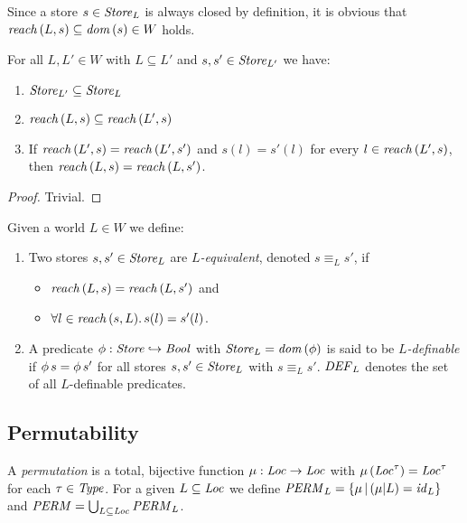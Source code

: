 \documentclass[12pt,a4paper]{report}
\newcommand{\DEF}{\nstyle{DEF}}
\newcommand{\PERM}{\nstyle{PERM}}
\newcommand{\id}{\nstyle{id}}
\begin{document}
Since a store $s\in\mathit{Store}_L$ is always closed by definition, it is obvious that
$\mathit{reach}\,(L,s) \subseteq \mathit{dom}\,(s) \in  W$ holds.

\begin{lemma}
  For all $L,L'\in W$ with $L \subseteq L'$ and $s,s'\in\mathit{Store}_{L'}$ we have:
  \begin{enumerate}
    \item $\mathit{Store}_{L'} \subseteq \mathit{Store}_L$
    \item $\mathit{reach}\,(L,s) \subseteq \mathit{reach}\,(L',s)$
    \item If $\mathit{reach}\,(L',s) = \mathit{reach}\,(L',s')$ and $s(l) = s'(l)$ for every $l\in\mathit{reach}\,(L',s)$,
          then $\mathit{reach}\,(L,s) = \mathit{reach}\,(L,s')$.
  \end{enumerate}
\end{lemma}

\begin{proof}
  Trivial.
\end{proof}

\begin{definition}
  Given a world $L \in W$ we define:
  \begin{enumerate}
    \item Two stores $s,s'\in\mathit{Store}_L$ are {\em $L$-equivalent}, denoted $s \equiv_L s'$, if
          \begin{itemize}
            \item $\mathit{reach}\,(L,s) = \mathit{reach}\,(L,s')$ and
            \item $\forall l\in\mathit{reach}\,(s,L).\,s(l)=s'(l)$.
          \end{itemize}

    \item A predicate $\phi:\mathit{Store} \hookrightarrow \mathit{Bool}$ with $\mathit{Store}_L = \mathit{dom}\,(\phi)$ is said to be
          {\em $L$-definable} if $\phi\,s = \phi\,s'$ for all stores
          $s,s'\in\mathit{Store}_L$ with $s \equiv_L s'$. $\DEF_L$ denotes the set of all $L$-definable
          predicates.
  \end{enumerate}
\end{definition}



\subsection{Permutability}

\begin{definition}[Permutation]
  A {\em permutation} is a total, bijective function $\mu:\mathit{Loc}\to\mathit{Loc}$ with
  $\mu\,(\mathit{Loc}^\tau)=\mathit{Loc}^\tau$ for each $\tau\in\mathit{Type}$.
  For a given $L \subseteq \mathit{Loc}$ we define $\PERM_L = \{\mu\,|\,(\mu|L) = \id_L\}$
  and $\PERM = \bigcup_{L\subseteq\Loc} \PERM_L$.
\end{definition}
\end{document}
